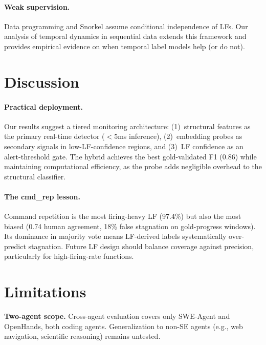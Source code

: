 \documentclass[11pt]{article}
\begin{document}
\paragraph{Weak supervision.}
Data programming \citep{ratner2016data} and Snorkel \citep{ratner2020snorkel} assume conditional independence of LFs.
Our analysis of temporal dynamics in sequential data extends this framework and provides empirical evidence on when temporal label models help (or do not).

\section{Discussion}
\label{sec:discussion}

\paragraph{Practical deployment.}
Our results suggest a tiered monitoring architecture: (1)~structural features as the primary real-time detector ($<$5ms inference), (2)~embedding probes as secondary signals in low-LF-confidence regions, and (3)~LF confidence as an alert-threshold gate.
The hybrid achieves the best gold-validated F1 (0.86) while maintaining computational efficiency, as the probe adds negligible overhead to the structural classifier.

\paragraph{The cmd\_rep lesson.}
Command repetition is the most firing-heavy LF (97.4\%) but also the most biased (0.74 human agreement, 18\% false stagnation on gold-progress windows).
Its dominance in majority vote means LF-derived labels systematically over-predict stagnation.
Future LF design should balance coverage against precision, particularly for high-firing-rate functions.

\section{Limitations}
\label{sec:limitations}

\textbf{Two-agent scope.} Cross-agent evaluation covers only SWE-Agent and OpenHands, both coding agents. Generalization to non-SE agents (e.g., web navigation, scientific reasoning) remains untested.
\end{document}
